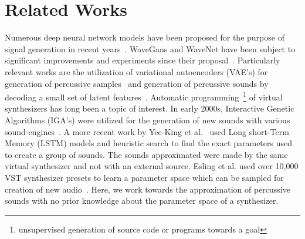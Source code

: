 \documentclass[runningheads,a4paper]{llncs}
\begin{document}
\section{Related Works}
Numerous deep neural network models have been proposed for the purpose of signal generation in recent years~\cite{nsynth2017,yamamoto2020parallel,oord2017parallel,yee2018automatic,ramires2020neural}. WaveGans and WaveNet have been subject to significant improvements and experiments since their proposal~\cite{nsynth2017,yamamoto2020parallel,oord2017parallel}. Particularly relevant works are the utilization of variational autoencoders (VAE's) for generation of percussive samples~\cite{aouameur2019neural} and generation of percussive sounds by decoding a small set of latent features~\cite{ramires2020neural}. Automatic programming~\footnote{unsupervised generation of source code or programs towards a goal} of virtual synthesizers has long been a topic of interest. In early 2000s, Interactive Genetic Algorithms (IGA's) were utilized for the generation of new sounds with various sound-engines~\cite{johnson1999exploring,dahlstedt2001creating}. A more recent work by Yee-King et al.~\cite{yee2018automatic} used Long short-Term Memory (LSTM) models and heuristic search to find the exact parameters used to create a group of sounds. The sounds approximated were made by the same virtual synthesizer and not with an external source. Esling et al. used  over 10,000 VST synthesizer presets to learn a parameter space which can be sampled for creation of new audio~\cite{esling2019universal}. Here, we work towards the approximation of percussive sounds with no prior knowledge about the parameter space of a synthesizer.
\end{document}
